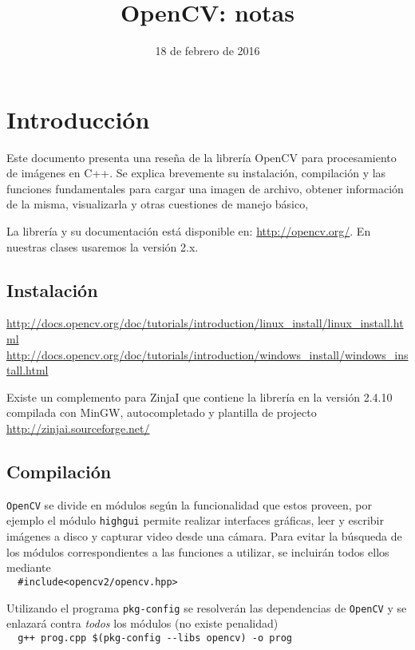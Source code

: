 \documentclass[oneside,a4paper]{book}
\title{OpenCV: notas}
\author{}
\date{18 de febrero de 2016}
\newcommand{\tc}[1]{\texttt{#1}}
\begin{document}
	\maketitle
	\tableofcontents
	\frontmatter
	\let\theoldsection\thesection
	\makeatletter
		\renewcommand\thesection{\@arabic \c@section}
	\makeatother
\chapter{Introducción}
Este documento presenta una reseña de la librería OpenCV para procesamiento de imágenes en C++. Se explica brevemente su instalación, compilación y las funciones fundamentales para cargar una imagen de archivo, obtener información de la misma, visualizarla y otras cuestiones de manejo básico,

La librería y su documentación está disponible en: \url{http://opencv.org/}. En nuestras clases usaremos la versión 2.x. %

	\section{Instalación}
\noindent\url{http://docs.opencv.org/doc/tutorials/introduction/linux_install/linux_install.html}\\
\url{http://docs.opencv.org/doc/tutorials/introduction/windows_install/windows_install.html}

Existe un complemento para ZinjaI que contiene la librería en la versión 2.4.10 compilada con MinGW, autocompletado y plantilla de projecto
\url{http://zinjai.sourceforge.net/}

	\section{Compilación}
\tc{OpenCV} se divide en módulos según la funcionalidad que estos proveen, por ejemplo el módulo \tc{highgui} permite realizar interfaces gráficas, leer y escribir imágenes a disco y capturar video desde una cámara.
Para evitar la búsqueda de los módulos correspondientes a las funciones a utilizar, se incluirán todos ellos mediante\\
\verb|  #include<opencv2/opencv.hpp>| %

Utilizando el programa \tc{pkg-config} se resolverán las dependencias de \tc{OpenCV} y se enlazará contra \emph{todos} los módulos (no existe penalidad)\\
\verb|  g++ prog.cpp $(pkg-config --libs opencv) -o prog|
\end{document}
